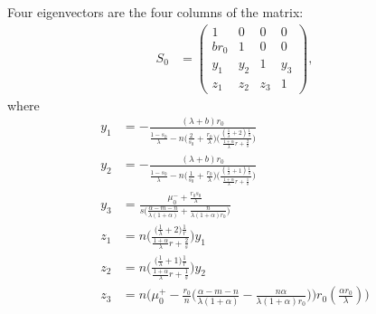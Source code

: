 \documentclass[a4paper,11pt]{article}
\begin{document}
Four eigenvectors are the four columns of the matrix:
\begin{align*}
 S_0&=
 \begin{pmatrix}
    1 & 0 & 0 & 0\\
    br_0 & 1 & 0 & 0\\
    y_1 & y_2 & 1 & y_3\\
    z_1 & z_2 & z_3 &1
 \end{pmatrix},
\end{align*}
where
\begin{align*}
 y_1&=-\frac{(\lambda+b)r_0}{\frac{1-s_0}{\lambda} - n\Big(\frac{2}{s_0}+\frac{r_0}{\lambda}\Big)\Big(\frac{(\frac{1}{\lambda}+2)\frac{1}{s}}{ \frac{1+\alpha}{\lambda}r + \frac{2}{s} }\Big) }\\
 y_2&=-\frac{(\lambda+b)r_0}{\frac{1-s_0}{\lambda} - n\Big(\frac{1}{s_0}+\frac{r_0}{\lambda}\Big)\Big(\frac{(\frac{1}{\lambda}+1)\frac{1}{s}}{ \frac{1+\alpha}{\lambda}r + \frac{1}{s} }\Big) }\\
 y_3&=\frac{\mu_0^- +\frac{r_0s_0}{\lambda}}{s\Big(\frac{\alpha-m-n}{\lambda(1+\alpha)} + \frac{n}{\lambda(1+\alpha)r_0}\Big)}\\
 z_1&=n\bigg(\frac{\big(\frac{1}{\lambda}+2\big)\frac{1}{r}}{ \frac{1+\alpha}{\lambda}r + \frac{2}{s} }\bigg)y_1 \\
 z_2&=n\bigg(\frac{\big(\frac{1}{\lambda}+1\big)\frac{1}{r}}{ \frac{1+\alpha}{\lambda}r + \frac{1}{s} }\bigg)y_2 \\
 z_3&=n\bigg(\mu_0^+-\frac{r_0}{n}\Big(\frac{\alpha-m-n}{\lambda(1+\alpha)} - \frac{n\alpha}{\lambda(1+\alpha)r_0}\Big)\bigg)r_0(\frac{\alpha r_0}{\lambda})\bigg)
\end{align*}

% 
\end{document}
